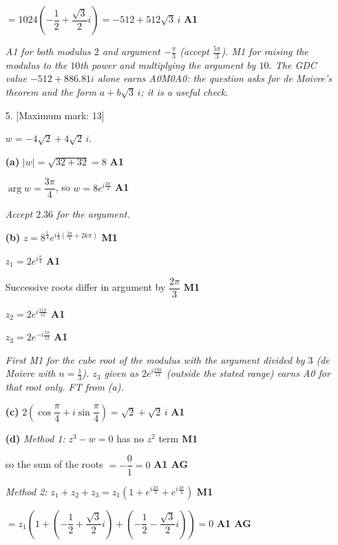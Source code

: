 \documentclass[12pt, twoside]{article}
\begin{document}
\begin{enumerate}[itemsep=0.3cm]
$= 1024\left(-\dfrac{1}{2} + \dfrac{\sqrt{3}}{2}i\right)
= -512 + 512\sqrt{3}\,i$ \hfill \textbf{A1}

\emph{A1 for both modulus $2$ and argument $-\frac{\pi}{3}$ (accept
$\frac{5\pi}{3}$). M1 for raising the modulus to the $10$th power and
multiplying the argument by $10$. The GDC value $-512 + 886.81i$ alone
earns A0M0A0: the question asks for de Moivre's theorem and the form
$a + b\sqrt{3}\,i$; it is a useful check.}

\newpage

\item[5.] [Maximum mark: 13]

$w = -4\sqrt{2} + 4\sqrt{2}\,i$.

\textbf{(a)} $|w| = \sqrt{32 + 32} = 8$ \hfill \textbf{A1}

$\arg w = \dfrac{3\pi}{4}$, so $w = 8e^{i\frac{3\pi}{4}}$ \hfill \textbf{A1}

\emph{Accept $2.36$ for the argument.}

\textbf{(b)} $z = 8^{\frac{1}{3}}e^{i\frac{1}{3}\left(\frac{3\pi}{4}
+ 2k\pi\right)}$ \hfill \textbf{M1}

$z_{1} = 2e^{i\frac{\pi}{4}}$ \hfill \textbf{A1}

Successive roots differ in argument by $\dfrac{2\pi}{3}$
\hfill \textbf{M1}

$z_{2} = 2e^{i\frac{11\pi}{12}}$ \hfill \textbf{A1}

$z_{3} = 2e^{-i\frac{5\pi}{12}}$ \hfill \textbf{A1}

\emph{First M1 for the cube root of the modulus with the argument divided
by $3$ (de Moivre with $n = \frac{1}{3}$). $z_{3}$ given as
$2e^{i\frac{19\pi}{12}}$ (outside the stated range) earns A0 for that root
only. FT from (a).}

\textbf{(c)} $2\left(\cos\dfrac{\pi}{4} + i\sin\dfrac{\pi}{4}\right)
= \sqrt{2} + \sqrt{2}\,i$ \hfill \textbf{A1}

\textbf{(d)} \emph{Method 1:} $z^{3} - w = 0$ has no $z^{2}$ term
\hfill \textbf{M1}

so the sum of the roots $= -\dfrac{0}{1} = 0$ \hfill \textbf{A1 AG}

\emph{Method 2:} $z_{1} + z_{2} + z_{3}
= z_{1}\left(1 + e^{i\frac{2\pi}{3}} + e^{i\frac{4\pi}{3}}\right)$
\hfill \textbf{M1}

$= z_{1}\left(1 + \left(-\dfrac{1}{2} + \dfrac{\sqrt{3}}{2}i\right)
+ \left(-\dfrac{1}{2} - \dfrac{\sqrt{3}}{2}i\right)\right) = 0$
\hfill \textbf{A1 AG}


\end{enumerate}
\end{document}
